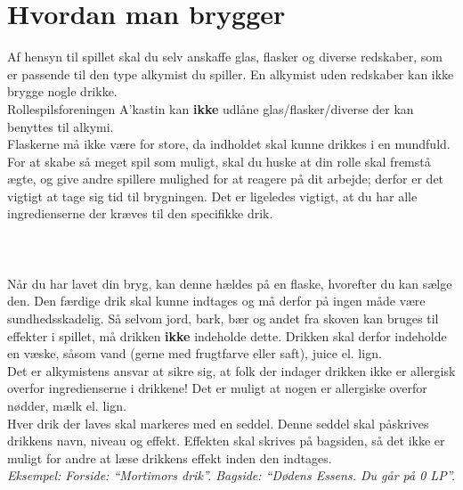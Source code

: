 \section*{Hvordan man brygger}
Af hensyn til spillet skal du selv anskaffe glas, flasker og diverse redskaber, som er passende til den type alkymist du spiller. En alkymist uden redskaber kan ikke brygge nogle drikke.\\
Rollespilsforeningen A’kastin kan \textbf{ikke} udlåne glas/flasker/diverse der kan benyttes til alkymi.\\
Flaskerne må ikke være for store, da indholdet skal kunne drikkes i en mundfuld.\\
For at skabe så meget spil som muligt, skal du huske at din rolle skal fremstå ægte, og give andre spillere mulighed for at reagere på dit arbejde; derfor er det vigtigt at tage sig tid til brygningen. Det er ligeledes vigtigt, at du har alle ingredienserne der kræves til den specifikke drik.\\
\\\\\\
Når du har lavet din bryg, kan denne hældes på en flaske, hvorefter du kan sælge den. Den færdige drik skal kunne indtages og må derfor på ingen måde være sundhedsskadelig. Så selvom jord, bark, bær og andet fra skoven kan bruges til effekter i spillet, må drikken \textbf{ikke} indeholde dette. Drikken skal derfor indeholde en væske, såsom vand (gerne med frugtfarve eller saft), juice el. lign.\\
Det er alkymistens ansvar at sikre sig, at folk der indager drikken ikke er allergisk overfor ingredienserne i drikkene! Det er muligt at nogen er allergiske overfor nødder, mælk el. lign.\\
Hver drik der laves skal markeres med en seddel. Denne seddel skal påskrives drikkens navn, niveau og effekt. Effekten skal skrives på bagsiden, så det ikke er muligt for andre at læse drikkens effekt inden den indtages.\\

\emph{Eksempel: Forside: “Mortimors drik”. Bagside: “Dødens Essens. Du går på 0 LP”.}

